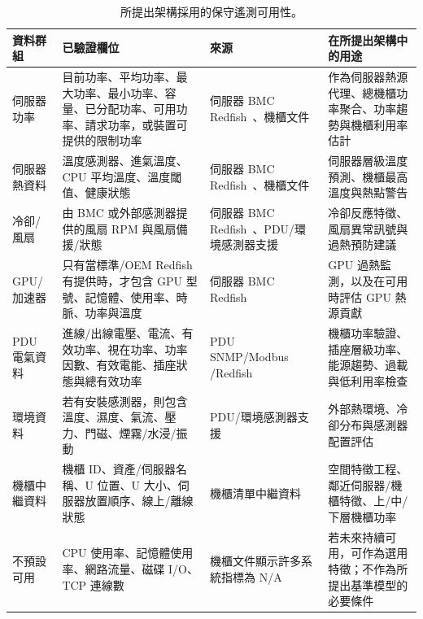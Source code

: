 \documentclass[12pt,a4paper]{article}
\begin{document}
\begin{table}[t]
\scriptsize
\centering
\caption{所提出架構採用的保守遙測可用性。}
\label{tab:telemetry_availability}
\footnotesize
\begin{tabularx}{\textwidth}{p{} p{} p{} Y}
\toprule
\textbf{資料群組} & \textbf{已驗證欄位} & \textbf{來源} & \textbf{在所提出架構中的用途} \\
\midrule
伺服器功率 & 目前功率、平均功率、最大功率、最小功率、容量、已分配功率、可用功率、請求功率，或裝置可提供的限制功率 & 伺服器 BMC Redfish~\cite{cortexdc_redfish_ref}、機櫃文件~\cite{cortexdc_datasheet_2026} & 作為伺服器熱源代理、總機櫃功率聚合、功率趨勢與機櫃利用率估計 \\
\addlinespace
伺服器熱資料 & 溫度感測器、進氣溫度、CPU 平均溫度、溫度閾值、健康狀態 & 伺服器 BMC Redfish~\cite{cortexdc_redfish_ref}、機櫃文件~\cite{cortexdc_datasheet_2026} & 伺服器層級溫度預測、機櫃最高溫度與熱點警告 \\
\addlinespace
冷卻/風扇 & 由 BMC 或外部感測器提供的風扇 RPM 與風扇備援/狀態 & 伺服器 BMC Redfish~\cite{cortexdc_redfish_ref}、PDU/環境感測器支援~\cite{cortexdc_pdu_ref} & 冷卻反應特徵、風扇異常訊號與過熱預防建議 \\
\addlinespace
GPU/加速器 & 只有當標準/OEM Redfish 有提供時，才包含 GPU 型號、記憶體、使用率、時脈、功率與溫度 & 伺服器 BMC Redfish~\cite{cortexdc_redfish_ref} & GPU 過熱監測，以及在可用時評估 GPU 熱源貢獻 \\
\addlinespace
PDU 電氣資料 & 進線/出線電壓、電流、有效功率、視在功率、功率因數、有效電能、插座狀態與總有效功率 & PDU SNMP/Modbus
/Redfish ~\cite{cortexdc_pdu_ref} & 機櫃功率驗證、插座層級功率、能源趨勢、過載與低利用率檢查 \\
\addlinespace
環境資料 & 若有安裝感測器，則包含溫度、濕度、氣流、壓力、門磁、煙霧/水浸/振動 & PDU/環境感測器支援~\cite{cortexdc_pdu_ref} & 外部熱環境、冷卻分布與感測器配置評估 \\
\addlinespace
機櫃中繼資料 & 機櫃 ID、資產/伺服器名稱、U 位置、U 大小、伺服器放置順序、線上/離線狀態 & 機櫃清單中繼資料~\cite{cortexdc_datasheet_2026} & 空間特徵工程、鄰近伺服器/機櫃特徵、上/中/下層機櫃功率 \\
\addlinespace
不預設可用 & CPU 使用率、記憶體使用率、網路流量、磁碟 I/O、TCP 連線數 & 機櫃文件顯示許多系統指標為 N/A~\cite{cortexdc_datasheet_2026} & 若未來持續可用，可作為選用特徵；不作為所提出基準模型的必要條件 \\
\bottomrule
\end{tabularx}
\end{table}
\end{document}
